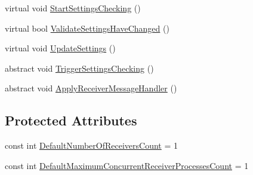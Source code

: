 \begin{DoxyCompactItemize}
\item 
virtual void \hyperlink{classCqrs_1_1Azure_1_1ServiceBus_1_1AzureBus_acb7f47329c17646805545e78d0776efe}{Start\+Settings\+Checking} ()
\item 
virtual bool \hyperlink{classCqrs_1_1Azure_1_1ServiceBus_1_1AzureBus_a9fa1f5a74819100c40d8079ac6a6adb9}{Validate\+Settings\+Have\+Changed} ()
\item 
virtual void \hyperlink{classCqrs_1_1Azure_1_1ServiceBus_1_1AzureBus_aa41ae78c1e674cfd9316c573ca5d1bab}{Update\+Settings} ()
\item 
abstract void \hyperlink{classCqrs_1_1Azure_1_1ServiceBus_1_1AzureBus_ae501f84c4983bfa3b2ae4551749ac998}{Trigger\+Settings\+Checking} ()
\item 
abstract void \hyperlink{classCqrs_1_1Azure_1_1ServiceBus_1_1AzureBus_aad25a164e9e526c59d8ef98635c98095}{Apply\+Receiver\+Message\+Handler} ()
\end{DoxyCompactItemize}
\subsection*{Protected Attributes}
\begin{DoxyCompactItemize}
\item 
const int \hyperlink{classCqrs_1_1Azure_1_1ServiceBus_1_1AzureBus_a19642a14d6cf036cbbdb68b9ba7e635d}{Default\+Number\+Of\+Receivers\+Count} = 1
\item 
const int \hyperlink{classCqrs_1_1Azure_1_1ServiceBus_1_1AzureBus_a12c3d07b7ad1836e85a449e6adc8b5df}{Default\+Maximum\+Concurrent\+Receiver\+Processes\+Count} = 1
\end{DoxyCompactItemize}

